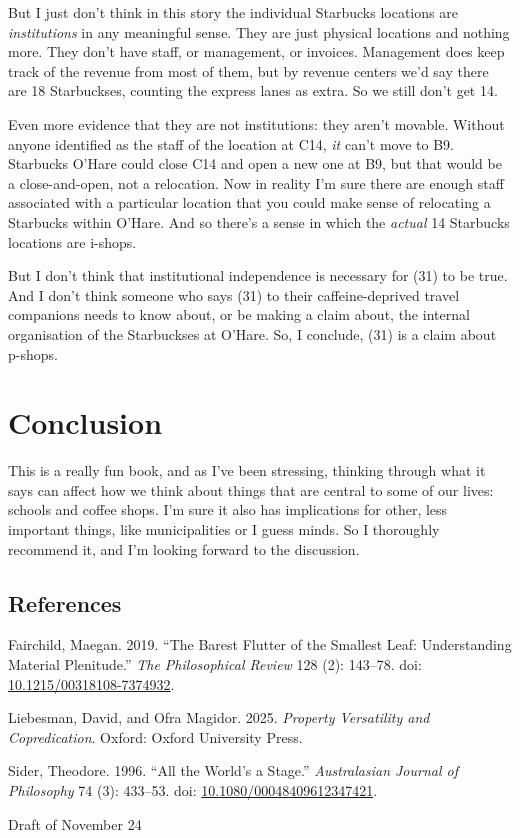 \documentclass[
  11pt,
  letterpaper,
  DIV=11,
  numbers=noendperiod,
  twoside]{scrartcl}
\newlength{\cslhangindent}
\newenvironment{CSLReferences}[2] %
 {\begin{list}{}{%
  \setlength{\itemindent}{0pt}
  \setlength{\leftmargin}{0pt}
  \setlength{\parsep}{0pt}
  \ifodd #1
   \setlength{\leftmargin}{\cslhangindent}
   \setlength{\itemindent}{-1\cslhangindent}
  \fi
  \setlength{\itemsep}{#2\baselineskip}}}
 {\end{list}}
\begin{document}
But I just don't think in this story the individual Starbucks locations
are \emph{institutions} in any meaningful sense. They are just physical
locations and nothing more. They don't have staff, or management, or
invoices. Management does keep track of the revenue from most of them,
but by revenue centers we'd say there are 18 Starbuckses, counting the
express lanes as extra. So we still don't get 14.

Even more evidence that they are not institutions: they aren't movable.
Without anyone identified as the staff of the location at C14, \emph{it}
can't move to B9. Starbucks O'Hare could close C14 and open a new one at
B9, but that would be a close-and-open, not a relocation. Now in reality
I'm sure there are enough staff associated with a particular location
that you could make sense of relocating a Starbucks within O'Hare. And
so there's a sense in which the \emph{actual} 14 Starbucks locations are
i-shops.

But I don't think that institutional independence is necessary for (31)
to be true. And I don't think someone who says (31) to their
caffeine-deprived travel companions needs to know about, or be making a
claim about, the internal organisation of the Starbuckses at O'Hare. So,
I conclude, (31) is a claim about p-shops.

\section{Conclusion}\label{conclusion}

This is a really fun book, and as I've been stressing, thinking through
what it says can affect how we think about things that are central to
some of our lives: schools and coffee shops. I'm sure it also has
implications for other, less important things, like municipalities or I
guess minds. So I thoroughly recommend it, and I'm looking forward to
the discussion.

\subsection*{References}\label{references}

\protect{}\label{refs}
\begin{CSLReferences}{1}{0}
Fairchild, Maegan. 2019. {``The Barest Flutter of the Smallest Leaf:
Understanding Material Plenitude.''} \emph{The Philosophical Review} 128
(2): 143--78. doi:
\href{https://doi.org/10.1215/00318108-7374932}{10.1215/00318108-7374932}.

Liebesman, David, and Ofra Magidor. 2025. \emph{Property Versatility and
Copredication}. Oxford: Oxford University Press.

Sider, Theodore. 1996. {``All the World's a Stage.''} \emph{Australasian
Journal of Philosophy} 74 (3): 433--53. doi:
\href{https://doi.org/10.1080/00048409612347421}{10.1080/00048409612347421}.

\end{CSLReferences}



\noindent Draft of November 24
\end{document}
